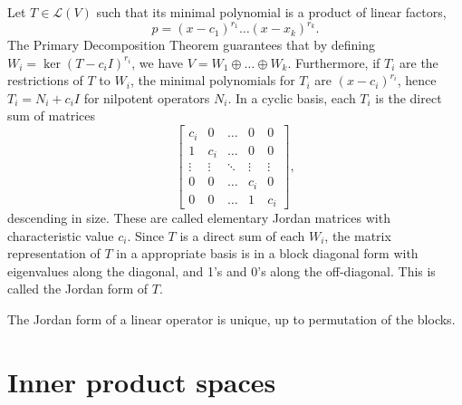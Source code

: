 \documentclass[11pt]{article}
\newcommand{\alg}[1]{\mathscr{#1}}
\newcommand{\algL}{\alg{L}}
\renewcommand{\ker}{\operatorname{ker}}
\theoremstyle{definition}
\theoremstyle{remark}
\numberwithin{equation}{section}
\begin{document}
    \begin{definition}
        Let $T \in \algL(V)$ such that its minimal polynomial is a product of
        linear factors, \[
            p = (x - c_1)^{r_1} \dots (x - x_k)^{r_k}.
        \] The Primary Decomposition Theorem guarantees that by defining $W_i =
        \ker{(T - c_iI)^{r_i}}$, we have $V = W_1 \oplus \dots \oplus W_k$.
        Furthermore, if $T_i$ are the restrictions of $T$ to $W_i$, the minimal
        polynomials for $T_i$ are $(x - c_i)^{r_i}$, hence $T_i = N_i + c_iI$ for
        nilpotent operators $N_i$. In a cyclic basis, each $T_i$ is the direct sum of
        matrices \[
            \begin{bmatrix}
                c_i & 0 & \dots & 0 & 0 \\
                1 & c_i & \dots & 0 & 0 \\
                \vdots & \vdots & \ddots & \vdots & \vdots \\
                0 & 0 & \dots & c_i & 0 \\
                0 & 0 & \dots & 1 & c_i
            \end{bmatrix},
        \] descending in size. These are called elementary Jordan matrices with
        characteristic value $c_i$. Since $T$ is a direct sum of each $W_i$, the
        matrix representation of $T$ in a appropriate basis is in a block diagonal
        form with eigenvalues along the diagonal, and 1's and 0's along the
        off-diagonal. This is called the Jordan form of $T$.
    \end{definition}

    \begin{theorem}
        The Jordan form of a linear operator is unique, up to permutation of the blocks.
    \end{theorem}




    \section{Inner product spaces}
\end{document}
